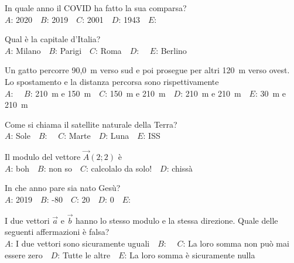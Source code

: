 \mcquestionheader In quale anno il COVID ha fatto la sua comparsa?\\
{$A$}: 2020\ \ {$B$}: 2019\ \ {$C$}: 2001\ \ {$D$}: 1943\ \ {$E$}: \ \ 

\mcquestionfooter



\def\mcquestionnumber{6}


\mcquestionheader Qual è la capitale d’Italia?\\
{$A$}: Milano\ \ {$B$}: Parigi\ \ {$C$}: Roma\ \ {$D$}: \ \ {$E$}: Berlino\ \ 

\mcquestionfooter



\def\mcquestionnumber{7}


\mcquestionheader Un gatto percorre 90,0~m verso sud e poi prosegue per altri 120~m verso ovest. Lo spostamento e la distanza percorsa sono rispettivamente\\
{$A$}: \ \ {$B$}: 210~m e 150~m\ \ {$C$}: 150~m e 210~m\ \ {$D$}: 210~m e 210~m\ \ {$E$}: 30~m e 210~m\ \ 

\mcquestionfooter



\def\mcquestionnumber{8}


\mcquestionheader Come si chiama il satellite naturale della Terra?\\
{$A$}: Sole\ \ {$B$}: \ \ {$C$}: Marte\ \ {$D$}: Luna\ \ {$E$}: ISS\ \ 

\mcquestionfooter



\def\mcquestionnumber{9}


\mcquestionheader Il modulo del vettore $\vec{A}(2;2)$ è\\
{$A$}: boh\ \ {$B$}: non so\ \ {$C$}: calcolalo da solo!\ \ {$D$}: chissà\ \ 

\mcquestionfooter



\def\mcquestionnumber{10}


\mcquestionheader In che anno pare sia nato Gesù?\\
{$A$}: 2019\ \ {$B$}: -80\ \ {$C$}: 20\ \ {$D$}: 0\ \ {$E$}: \ \ 

\mcquestionfooter



\def\mcquestionnumber{11}


\mcquestionheader I due vettori $\vec{a}$ e $\vec{b}$ hanno lo stesso modulo e la stessa direzione. Quale delle seguenti affermazioni è falsa?\\
{$A$}: I due vettori sono sicuramente uguali\ \ {$B$}: \ \ {$C$}: La loro somma non può mai essere zero\ \ {$D$}: Tutte le altre\ \ {$E$}: La loro somma è sicuramente nulla\ \ 

